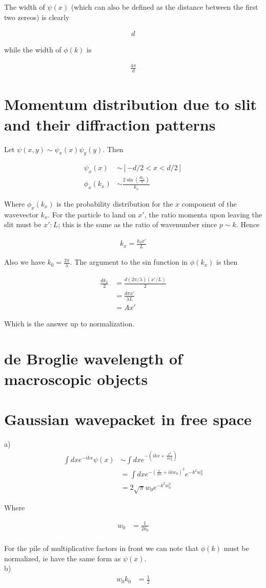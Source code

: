 \documentclass{article}
\newcommand{\half}{\frac{1}{2}}
\newcommand{\<}{\langle}
\renewcommand{\>}{\rangle}
\begin{document}
The width of $\psi(x)$ (which can also be defined as the distance between the first two zereos) is clearly

\begin{align*}
d
\end{align*}

while the width of $\phi(k)$ is

\begin{align*}
\frac{4\pi}{d}
\end{align*}

\section{Momentum distribution due to slit and their diffraction patterns}

Let $\psi(x,y) \sim \psi_x(x)\psi_y(y)$. Then

\begin{align*}
\psi_x(x) &\sim [-d/2 < x < d/2] \\
\phi_x(k_x) &\sim \frac{2\sin(\frac{dk_x}{2})}{k_x}
\end{align*}

Where $\phi_x(k_x)$ is the probability distribution for the $x$ component of the wavevector $k_x$. For the particle to land on $x'$, the ratio momenta upon leaving the slit must be $x' : L$; this is the same as the ratio of wavenumber since $p \sim k$. Hence 

\begin{align*}
k_x = \frac{k_0 x'}{L}
\end{align*}

Also we have $k_0 = \frac{2\pi}{\lambda}$. The argument to the sin function in $\phi(k_x)$ is then

\begin{align*}
\frac{dk_x}{2} &= \frac{d (2\pi/\lambda) (x' / L)}{2} \\
&= \frac{d \pi x'}{\lambda L} \\
&= Ax'
\end{align*}

Which is the answer up to normalization.

\section{de Broglie wavelength of macroscopic objects}
\section{Gaussian wavepacket in free space}
a)
\begin{align*}
\int dx e^{-ikx} \psi(x) &\sim \int dx e^{-(ikx + \frac{x^2}{4w_0^2})} \\
&= \int dx e^{-(\frac{x}{2w} + ikw_0)^2} e^{-k^2w_0^2}\\
&= 2 \sqrt\pi w_0 e^{-k^2 w_0^2}
\end{align*}

Where

\begin{align*}
w_0 &= \frac{1}{2k_0} \\
\end{align*}

For the pile of multiplicative factors in front we can note that $\phi(k)$ must be normalized, ie have the same form as $\psi(x)$. 
\\
b)
\begin{align*}
w_0 k_0 &= \half
\end{align*}
\end{document}
